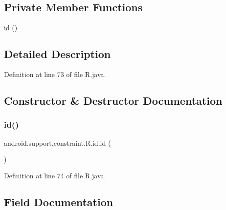 \subsection*{Private Member Functions}
\begin{DoxyCompactItemize}
\item 
\mbox{\hyperlink{classandroid_1_1support_1_1constraint_1_1_r_1_1id_a0f97781bd09b7d7367d4e392b891e2de}{id}} ()
\end{DoxyCompactItemize}


\subsection{Detailed Description}


Definition at line 73 of file R.\+java.



\subsection{Constructor \& Destructor Documentation}
\mbox{\label{classandroid_1_1support_1_1constraint_1_1_r_1_1id_a0f97781bd09b7d7367d4e392b891e2de}} 
\subsubsection{\texorpdfstring{id()}{id()}}
{\footnotesize\ttfamily android.\+support.\+constraint.\+R.\+id.\+id (\begin{DoxyParamCaption}{ }\end{DoxyParamCaption})\hspace{0.3cm}{\ttfamily [private]}}



Definition at line 74 of file R.\+java.


\begin{DoxyCode}{0}

\end{DoxyCode}


\subsection{Field Documentation}
\mbox{\label{classandroid_1_1support_1_1constraint_1_1_r_1_1id_aac6970b85d00403c4068ba6add94397e}} 

